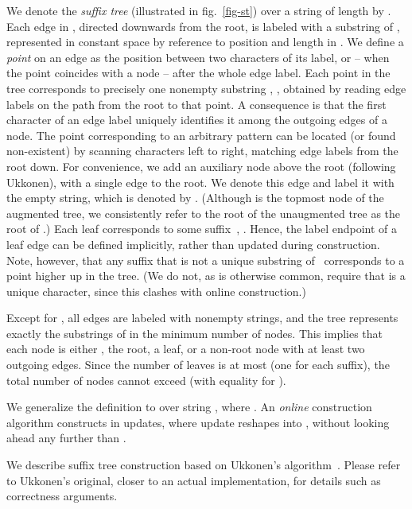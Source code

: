 \documentclass{llncs}
\begin{document}
We denote the \emph{suffix tree} (illustrated in fig.~\ref{fig-st}) over a
string  of length  by \!. Each edge in
\!, directed downwards from the root, is labeled with a substring of
\!, represented in constant space by reference to position and length in
\!. We define a \emph{point} on an  edge as the position between two
characters of its label, or -- when the point coincides with a node -- after
the whole edge label. Each point in the tree corresponds to precisely one
nonempty substring , , obtained by reading edge
labels on the path from the root to that point. A consequence is that the first
character of an edge label uniquely identifies it among the outgoing edges of a
node. The point corresponding to an arbitrary pattern can be located (or found
non-existent) by scanning characters left to right, matching edge labels from
the root down.  For convenience, we add an auxiliary node  above the
root (following Ukkonen), with a single edge to the root. We denote this edge
 and label it with the empty string, which is denoted by
. (Although  is the topmost node of the augmented tree,
we consistently refer to the root of the unaugmented tree as the root of
\!.) Each leaf corresponds to some suffix~, . Hence, the label endpoint of a leaf edge can be defined implicitly,
rather than updated during construction. Note, however, that any suffix that is
not a unique substring of~ corresponds to a point higher up in the tree. (We
do not, as is otherwise common, require that  is a unique character,
since this clashes with online construction.)

Except for , all edges are labeled with nonempty strings,
and the tree represents exactly the substrings of  in the minimum number of
nodes. This implies that each node is either , the root, a leaf, or a
non-root node with at least two outgoing edges. Since the number of leaves is
at most  (one for each suffix), the total number of nodes cannot exceed
 (with equality for ).



We generalize the definition to  over string , where . An \emph{online} construction algorithm
constructs  in  updates, where update  reshapes
 into , without looking ahead any further than .


We describe suffix tree construction based on Ukkonen's algorithm~\cite{UkkoOnli}. Please refer to Ukkonen's original,
closer to an actual implementation, for details such as
correctness arguments.
\end{document}
